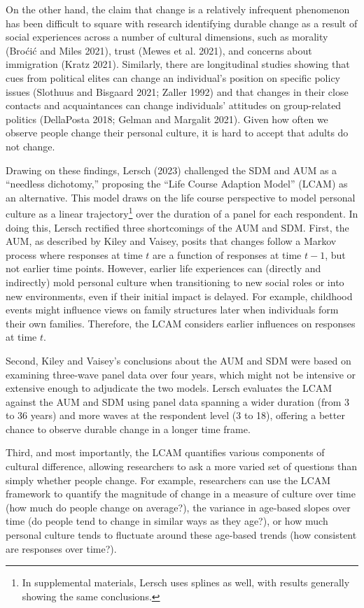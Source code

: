 \documentclass[
  11pt,
]{article}
\begin{document}
On the other hand, the claim that change is a relatively infrequent
phenomenon has been difficult to square with research identifying
durable change as a result of social experiences across a number of
cultural dimensions, such as morality (Broćić and Miles 2021), trust
(Mewes et al. 2021), and concerns about immigration (Kratz 2021).
Similarly, there are longitudinal studies showing that cues from
political elites can change an individual's position on specific policy
issues (Slothuus and Bisgaard 2021; Zaller 1992) and that changes in
their close contacts and acquaintances can change individuals' attitudes
on group-related politics (DellaPosta 2018; Gelman and Margalit 2021).
Given how often we observe people change their personal culture, it is
hard to accept that adults do not change.

Drawing on these findings, Lersch (2023) challenged the SDM and AUM as a
``needless dichotomy,'' proposing the ``Life Course Adaption Model''
(LCAM) as an alternative. This model draws on the life course
perspective to model personal culture as a linear trajectory\footnote{In
  supplemental materials, Lersch uses splines as well, with results
  generally showing the same conclusions.} over the duration of a panel
for each respondent. In doing this, Lersch rectified three shortcomings
of the AUM and SDM. First, the AUM, as described by Kiley and Vaisey,
posits that changes follow a Markov process where responses at time
\(t\) are a function of responses at time \(t-1\), but not earlier time
points. However, earlier life experiences can (directly and indirectly)
mold personal culture when transitioning to new social roles or into new
environments, even if their initial impact is delayed. For example,
childhood events might influence views on family structures later when
individuals form their own families. Therefore, the LCAM considers
earlier influences on responses at time \(t\).

Second, Kiley and Vaisey's conclusions about the AUM and SDM were based
on examining three-wave panel data over four years, which might not be
intensive or extensive enough to adjudicate the two models. Lersch
evaluates the LCAM against the AUM and SDM using panel data spanning a
wider duration (from 3 to 36 years) and more waves at the respondent
level (3 to 18), offering a better chance to observe durable change in a
longer time frame.

Third, and most importantly, the LCAM quantifies various components of
cultural difference, allowing researchers to ask a more varied set of
questions than simply whether people change. For example, researchers
can use the LCAM framework to quantify the magnitude of change in a
measure of culture over time (how much do people change on average?),
the variance in age-based slopes over time (do people tend to change in
similar ways as they age?), or how much personal culture tends to
fluctuate around these age-based trends (how consistent are responses
over time?).
\end{document}
